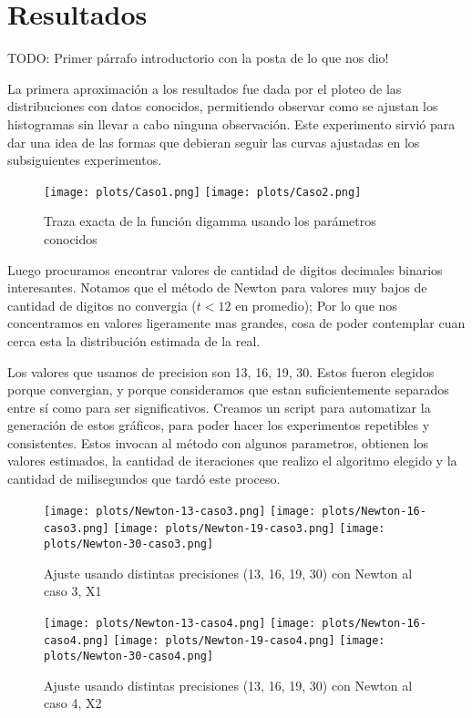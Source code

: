 \section{Resultados}

TODO: Primer p\'arrafo introductorio con la posta de lo que nos dio!

La primera aproximaci\'on a los resultados fue dada por el ploteo de las distribuciones con datos conocidos, permitiendo observar como se ajustan los histogramas sin llevar a cabo ninguna observaci\'on. Este experimento sirvi\'o para dar una idea de las formas que debieran seguir las curvas ajustadas en los subsiguientes experimentos.

\begin{figure} [H]
\begin {center}
\texttt{[image: plots/Caso1.png]}
\texttt{[image: plots/Caso2.png]}
\end {center}
\caption{Traza exacta de la funci\'on digamma usando los par\'ametros conocidos}
\label{fig:FitCaso3Newton}
\end{figure}

Luego procuramos encontrar valores de cantidad de digitos decimales binarios interesantes. Notamos que el m\'etodo de Newton
para valores muy bajos de cantidad de digitos no convergia ($t < 12$ en promedio); Por lo que nos concentramos en valores
ligeramente mas grandes, cosa de poder contemplar cuan cerca esta la distribuci\'on estimada de la real.

Los valores que usamos de precision son 13, 16, 19, 30. Estos fueron elegidos porque convergian, y porque consideramos que estan
suficientemente separados entre s\'i como para ser significativos. Creamos un script para automatizar la generaci\'on de estos gr\'aficos,
para poder hacer los experimentos repetibles y consistentes. Estos invocan al m\'etodo con algunos parametros, obtienen los
valores estimados, la cantidad de iteraciones que realizo el algoritmo elegido y la cantidad de milisegundos que tard\'o este proceso.


\begin{figure} [H]

\texttt{[image: plots/Newton-13-caso3.png]}
\texttt{[image: plots/Newton-16-caso3.png]}
\texttt{[image: plots/Newton-19-caso3.png]}
\texttt{[image: plots/Newton-30-caso3.png]}

\caption{Ajuste usando distintas precisiones (13, 16, 19, 30) con Newton al caso 3, X1}
\label{fig:FitCaso3Newton}
\end{figure}

\begin{figure} [H]

\texttt{[image: plots/Newton-13-caso4.png]}
\texttt{[image: plots/Newton-16-caso4.png]}
\texttt{[image: plots/Newton-19-caso4.png]}
\texttt{[image: plots/Newton-30-caso4.png]}

\caption{Ajuste usando distintas precisiones (13, 16, 19, 30) con Newton al caso 4, X2}
\label{fig:FitCaso4Newton}
\end{figure}
